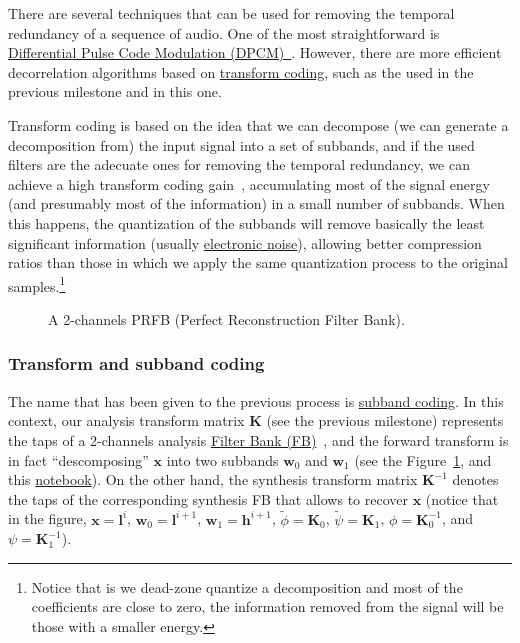 There are several techniques that can be used for removing the
temporal redundancy of a sequence of audio. One of the most
straightforward is
\href{https://en.wikipedia.org/wiki/Differential_pulse-code_modulation}{Differential
  Pulse Code Modulation
  (DPCM)~\cite{sayood2017introduction}}. However, there are more
efficient decorrelation algorithms based on
\href{https://en.wikipedia.org/wiki/Transform_coding}{transform
  coding}, such as the used in the previous milestone and in this one.

Transform coding is based on the idea that we can decompose (we can
generate a decomposition from) the input signal into a set of
subbands, and if the used filters are the adecuate ones for removing
the temporal redundancy, we can achieve a high transform coding
gain~\cite{sayood2017introduction}, accumulating most of the signal
energy (and presumably most of the information) in a small number of
subbands. When this happens, the quantization of the subbands will
remove basically the least significant information (usually
\href{https://en.wikipedia.org/wiki/Noise_(electronics)}{electronic
  noise}), allowing better compression ratios than those in which we
apply the same quantization process to the original
samples.\footnote{Notice that is we dead-zone quantize a decomposition
and most of the coefficients are close to zero, the information
removed from the signal will be those with a smaller energy.}

\begin{figure}
  \centering
  \caption{A 2-channels PRFB (Perfect Reconstruction Filter Bank).}
  \label{fig:PRFB}
\end{figure}


\subsubsection{Transform and subband coding}

The name that has been given to the previous process is
\href{https://en.wikipedia.org/wiki/Sub-band_coding}{subband
  coding}. In this context, our analysis transform matrix
${\mathbf K}$ (see the previous milestone) represents the taps of a
2-channels analysis
\href{https://en.wikipedia.org/wiki/Filter_bank}{Filter Bank
  (FB)}~\cite{vetterli1995wavelets}, and the forward transform is in
fact ``descomposing'' ${\mathbf x}$ into two subbands ${\mathbf w}_0$
and ${\mathbf w}_1$ (see the Figure~\ref{fig:PRFB}, and this
\href{https://github.com/Tecnologias-multimedia/intercom/blob/master/docs/PRFB.ipynb}{notebook}). On
the other hand, the synthesis transform matrix ${\mathbf K}^{-1}$
denotes the taps of the corresponding synthesis FB that allows to
recover ${\mathbf x}$ (notice that in the figure,
${\mathbf x}={\mathbf l}^i$, ${\mathbf w}_0={\mathbf l}^{i+1}$,
${\mathbf w}_1={\mathbf h}^{i+1}$, $\tilde\phi={\mathbf K}_0$,
$\tilde\psi={\mathbf K}_1$, $\phi={\mathbf K}^{-1}_0$, and
$\psi={\mathbf K}^{-1}_1$).

